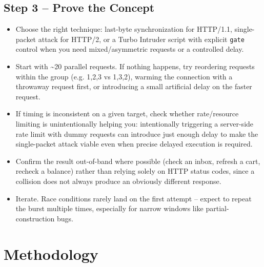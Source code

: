 \documentclass[11pt]{article}
\begin{document}
\subsection{Step 3 -- Prove the Concept}
\begin{itemize}[leftmargin=1.2em]
  \item Choose the right technique: last-byte synchronization for HTTP/1.1, single-packet attack for HTTP/2, or a Turbo Intruder script with explicit \texttt{gate} control when you need mixed/asymmetric requests or a controlled delay.
  \item Start with \textasciitilde20 parallel requests. If nothing happens, try reordering requests within the group (e.g. 1,2,3 vs 1,3,2), warming the connection with a throwaway request first, or introducing a small artificial delay on the faster request.
  \item If timing is inconsistent on a given target, check whether rate/resource limiting is unintentionally helping you: intentionally triggering a server-side rate limit with dummy requests can introduce just enough delay to make the single-packet attack viable even when precise delayed execution is required.
  \item Confirm the result out-of-band where possible (check an inbox, refresh a cart, recheck a balance) rather than relying solely on HTTP status codes, since a collision does not always produce an obviously different response.
  \item Iterate. Race conditions rarely land on the first attempt -- expect to repeat the burst multiple times, especially for narrow windows like partial-construction bugs.
\end{itemize}
 


\section{Methodology}
\end{document}
